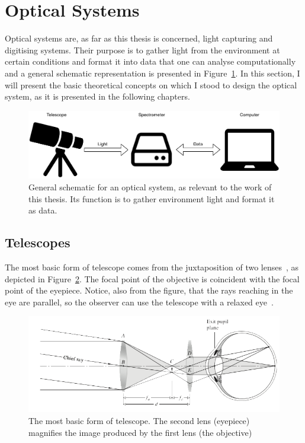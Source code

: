 \section{Optical Systems}%
\label{sec:theobg_opticalsystems}

Optical systems are, as far as this thesis is concerned, light capturing
and digitising systems. Their purpose is to gather light from the
environment at certain conditions and format it into data that one can
analyse computationally and a general schematic representation is
presented in Figure~\ref{fig:theobg_opticalsystems_generalschematic}.
In this section, I will present the basic theoretical concepts on which
I stood to design the optical system, as it is presented in the
following chapters. 

\begin{figure}[htpb]
    \centering
    \includegraphics[width=.8\textwidth]{img/pdf/opticalSystemBasic.drawio.pdf}
    \caption{General schematic for an optical system, as relevant to the
    work of this thesis. Its function is to gather environment light and
    format it as data.}%
    \label{fig:theobg_opticalsystems_generalschematic}
\end{figure}

\subsection{Telescopes}%
\label{sub:theobg_opticalsystems_telescopes}

The most basic form of telescope comes from the juxtaposition of two
lenses~\cite{Hecht2016}, as depicted in
Figure~\ref{fig:basic_telescope}. The focal point of the objective is
coincident with the focal point of the eyepiece. Notice, also from the
figure, that the rays reaching in the eye are parallel, so the observer
can use the telescope with a relaxed eye~\cite{Hecht2016}.

\begin{figure}[htpb]
    \centering
    \includegraphics[width=0.8\linewidth]{img/png/telescope.png}
    \caption{The most basic form of telescope. The second lens
    (eyepiece) magnifies the image produced by the first lens (the
    objective)~\cite{Hecht2016}}%
    \label{fig:basic_telescope}
\end{figure}

